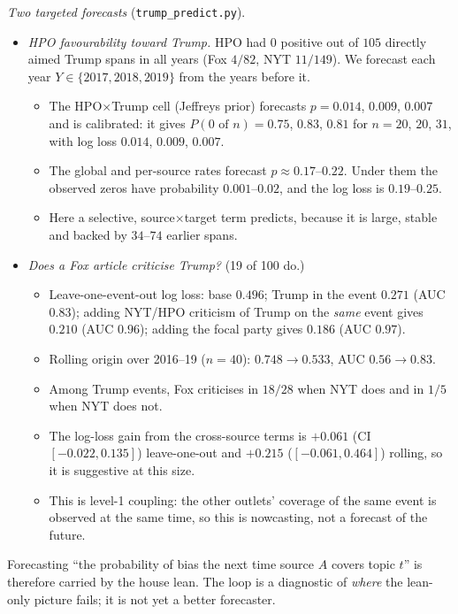\documentclass[11pt]{article}
\theoremstyle{definition}
\theoremstyle{remark}
\begin{document}
\emph{Two targeted forecasts} (\texttt{trump\_predict.py}).
\begin{itemize}
  \item \emph{HPO favourability toward Trump.} HPO had $0$ positive out of $105$ directly aimed Trump spans in all years (Fox $4/82$, NYT $11/149$). We forecast each year $Y\in\{2017,2018,2019\}$ from the years before it.
  \begin{itemize}
    \item The HPO$\times$Trump cell (Jeffreys prior) forecasts $p=0.014$, $0.009$, $0.007$ and is calibrated: it gives $P(0\text{ of }n)=0.75$, $0.83$, $0.81$ for $n=20$, $20$, $31$, with log loss $0.014$, $0.009$, $0.007$.
    \item The global and per-source rates forecast $p\approx0.17$--$0.22$. Under them the observed zeros have probability $0.001$--$0.02$, and the log loss is $0.19$--$0.25$.
    \item Here a selective, source$\times$target term predicts, because it is large, stable and backed by $34$--$74$ earlier spans.
  \end{itemize}
  \item \emph{Does a Fox article criticise Trump?} (19 of 100 do.)
  \begin{itemize}
    \item Leave-one-event-out log loss: base $0.496$; Trump in the event $0.271$ (AUC $0.83$); adding NYT/HPO criticism of Trump on the \emph{same} event gives $0.210$ (AUC $0.96$); adding the focal party gives $0.186$ (AUC $0.97$).
    \item Rolling origin over 2016--19 ($n=40$): $0.748\to0.533$, AUC $0.56\to0.83$.
    \item Among Trump events, Fox criticises in $18/28$ when NYT does and in $1/5$ when NYT does not.
    \item The log-loss gain from the cross-source terms is $+0.061$ (CI $[-0.022,0.135]$) leave-one-out and $+0.215$ ($[-0.061,0.464]$) rolling, so it is suggestive at this size.
    \item This is level-1 coupling: the other outlets' coverage of the same event is observed at the same time, so this is nowcasting, not a forecast of the future.
  \end{itemize}
\end{itemize}

Forecasting ``the probability of bias the next time source $A$ covers topic $t$'' is therefore carried by the house lean. The loop is a diagnostic of \emph{where} the lean-only picture fails; it is not yet a better forecaster.
\end{document}

